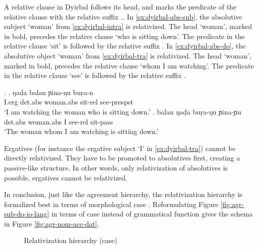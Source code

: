 A relative clause in Dyirbal follows its head, and marks the predicate of the relative clause with the relative suffix ..
In \ref{ex:dyirbal-abs-sub}, the absolutive subject  `woman' from \ref{ex:dyirbal-intra} is relativized. The head  `woman', marked in bold, precedes the relative clause  `who is sitting down'. The predicate in the relative clause  `sit' is followed by the relative suffix .
In \ref{ex:dyirbal-abs-do}, the absolutive object  `woman' from \ref{ex:dyirbal-tra} is relativized. The head  `woman', marked in bold, precedes the relative clause  `whom I am watching'. The predicate in the relative clause  `see' is followed by the relative suffix .

\ex.
\ag. ŋad̦a balan  ɲina-ŋu buŗa-n\\
 I.\ac{erg} \ac{det}.\ac{abs} woman.\ac{abs} sit-\ac{rel} see-\ac{pres}\ac{pst}\\
 `I am watching the woman who is sitting down.'\label{ex:dyirbal-abs-sub}
\bg. balan  ŋad̦a buŗa-ŋu ɲina-ɲu\\
 \ac{det}.\ac{abs} woman.\ac{abs} I see-\ac{rel} sit-\ac{pass}\\
 `The woman whom I am watching is sitting down.'\label{ex:dyirbal-abs-do}

Ergatives (for instance the ergative subject  `I' in \ref{ex:dyirbal-tra}) cannot be directly relativized. They have to be promoted to absolutives first, creating a passive-like structure. In other words, only relativization of absolutives is possible, ergatives cannot be relativized.

In conclusion, just like the agreement hierarchy, the relativization hierarchy is formalized best in terms of morphological case \citep[cf.][]{caha2009}. Reformulating Figure \ref{fig:agr-sub-do-io-lang} in terms of case instead of grammatical function gives the schema in Figure \ref{fig:agr-nom-acc-dat}.

\begin{figure}[H]
  \centering
  \caption{Relativization hierarchy (case)}
  \label{fig:rel-def-dep-dat}
\end{figure}

